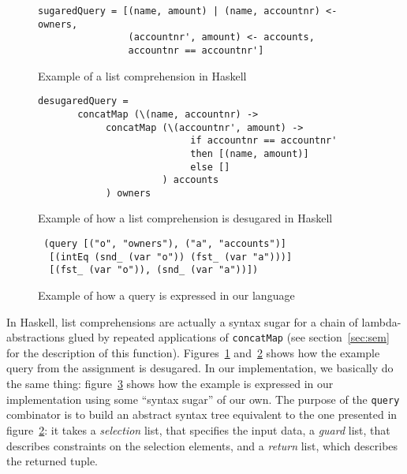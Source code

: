 \documentclass[10pt, oneside]{article}
\begin{document}
\begin{figure}[h!]
  \centering
\begin{verbatim}
sugaredQuery = [(name, amount) | (name, accountnr) <- owners,
                (accountnr', amount) <- accounts,
                accountnr == accountnr']
\end{verbatim}

      \caption{Example of a list comprehension in Haskell}
  \label{fig:sugar}
\end{figure}

\begin{figure}[h!]
  \centering

\begin{verbatim}
desugaredQuery =
       concatMap (\(name, accountnr) ->
            concatMap (\(accountnr', amount) ->
                           if accountnr == accountnr'
                           then [(name, amount)]
                           else []
                      ) accounts
            ) owners
\end{verbatim}

  \caption{Example of how a list comprehension is desugared in Haskell}
  \label{fig:desugar}
\end{figure}

\begin{figure}[h!]
  \centering

\begin{verbatim}
 (query [("o", "owners"), ("a", "accounts")]
  [(intEq (snd_ (var "o")) (fst_ (var "a")))]
  [(fst_ (var "o")), (snd_ (var "a"))])
\end{verbatim}

  \caption{Example of how a query is expressed in our language}
  \label{fig:ours}
\end{figure}

In Haskell, list comprehensions are actually a syntax sugar for a chain of
lambda-abstractions glued by repeated applications of \texttt{concatMap} (see
section~\ref{sec:sem} for the description of this
function). Figures~\ref{fig:sugar} and~\ref{fig:desugar} shows how the example
query from the assignment is desugared. In our implementation, we basically do
the same thing: figure~\ref{fig:ours} shows how the example is expressed in our
implementation using some ``syntax sugar'' of our own. The purpose of the
\texttt{query} combinator is to build an abstract syntax tree equivalent to the
one presented in figure~\ref{fig:desugar}: it takes a \textit{selection} list,
that specifies the input data, a \textit{guard} list, that describes constraints
on the selection elements, and a \textit{return} list, which describes the
returned tuple.
\end{document}
